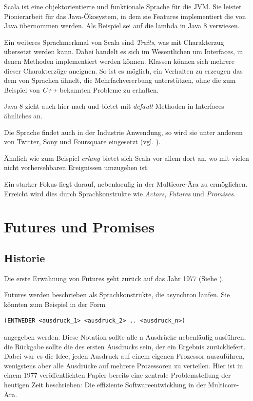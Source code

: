 \documentclass[11pt,a4paper,titlepage,ngerman]{scrartcl}
\begin{document}
Scala ist eine objektorientierte und funktionale Sprache für die JVM. Sie
leistet Pionierarbeit für das Java-Ökosystem, in dem sie Features implementiert
die von Java übernommen werden. Als Beispiel sei auf die \gls{lambda} in
Java 8 verwiesen.

Ein weiteres Sprachmerkmal von Scala sind \emph{Traits}, was mit 
\glqq Charakterzug\grqq{} übersetzt werden kann. Dabei handelt es sich im
Wesentlichen um Interfaces, in denen Methoden implementiert werden können.
Klassen können sich mehrere dieser \glqq Charakterzüge\grqq{} aneignen.
So ist es möglich, ein Verhalten zu erzeugen das dem von Sprachen ähnelt, die
Mehrfachvererbung unterstützen, ohne die zum Beispiel von \emph{C++} bekannten
Probleme zu erhalten.

Java 8 zieht auch hier nach und bietet mit \emph{default}-Methoden in Interfaces
ähnliches an.

Die Sprache findet auch in der Industrie Anwendung, so wird sie unter anderem von Twitter,
Sony und Foursquare eingesetzt (vgl. \cite{scalaInEnterprise}).

Ähnlich wie zum Beispiel \emph{\gls{erlang}} bietet sich Scala vor allem dort an,
wo mit vielen nicht vorhersehbaren Ereignissen umzugehen ist.

Ein starker Fokus liegt darauf, \gls{nebenlaeufig} in der Multicore-Ära
zu ermöglichen. Erreicht wird dies durch Sprachkonstrukte wie \emph{Actors},
\emph{Futures} und \emph{Promises}.


\section{Futures und Promises}

\subsection{Historie}

Die erste Erwähnung von Futures geht zurück auf das Jahr 1977 
(Siehe \cite{Baker:1977:IGC:872734.806932}).

Futures werden beschrieben als Sprachkonstrukte, die asynchron laufen. Sie 
könnten zum Beispiel in der Form 
\begin{lstlisting}
(ENTWEDER <ausdruck_1> <ausdruck_2> .. <ausdruck_n>)
\end{lstlisting}
angegeben werden. Diese Notation sollte alle n Ausdrücke nebenläufig ausführen, 
die Rückgabe sollte die des ersten Ausdrucks sein, der ein Ergebnis zurückliefert.
Dabei war es die Idee, jeden Ausdruck auf einem eigenen Prozessor auszuführen, 
wenigstens aber alle Ausdrücke auf mehrere Prozessoren zu verteilen. Hier ist in 
einem 1977 veröffentlichten Papier bereits eine zentrale Problemstellung der 
heutigen Zeit beschrieben: Die effiziente Softwareentwicklung in der Multicore-Ära.
\end{document}
